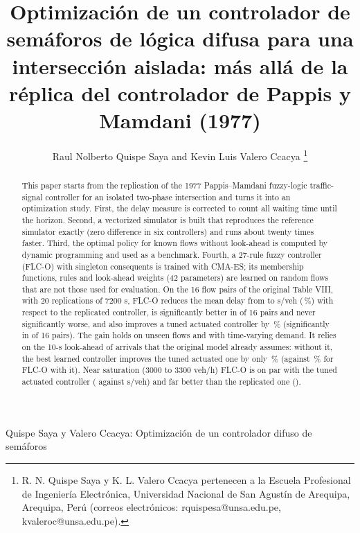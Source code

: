 \documentclass[journal]{IEEEtran}
\begin{document}
\title{Optimización de un controlador de semáforos de lógica difusa para una intersección aislada: más allá de la réplica del controlador de Pappis y Mamdani (1977)}

\author{Raul Nolberto Quispe Saya and Kevin Luis Valero Ccacya%
\thanks{R. N. Quispe Saya y K. L. Valero Ccacya pertenecen a la Escuela Profesional de Ingeniería Electrónica, Universidad Nacional de San Agustín de Arequipa, Arequipa, Perú (correos electrónicos: rquispesa@unsa.edu.pe, kvaleroc@unsa.edu.pe).}}

%
{Quispe Saya y Valero Ccacya: Optimización de un controlador difuso de semáforos}

\maketitle

\begin{abstract}
This paper starts from the replication of the 1977 Pappis--Mamdani fuzzy-logic traffic-signal controller for an isolated two-phase intersection and turns it into an optimization study. First, the delay measure is corrected to count all waiting time until the horizon. Second, a vectorized simulator is built that reproduces the reference simulator exactly (zero difference in six controllers) and runs about twenty times faster. Third, the optimal policy for known flows without look-ahead is computed by dynamic programming and used as a benchmark. Fourth, a 27-rule fuzzy controller (FLC-O) with singleton consequents is trained with CMA-ES; its membership functions, rules and look-ahead weights (42 parameters) are learned on random flows that are not those used for evaluation. On the 16 flow pairs of the original Table VIII, with 20 replications of 7200 s, FLC-O reduces the mean delay from \DelayOfPap{} to \DelayOfFlc{} s/veh (\RedFlc\,\%) with respect to the replicated controller, is significantly better in \ParMejorPap{} of 16 pairs and never significantly worse, and also improves a tuned actuated controller by \RedActAfOf\,\% (significantly in \ParMejorActAf{} of 16 pairs). The gain holds on unseen flows and with time-varying demand. It relies on the 10-s look-ahead of arrivals that the original model already assumes: without it, the best learned controller improves the tuned actuated one by only \RedActMlpC\,\% (against \RedActAfOf\,\% for FLC-O with it). Near saturation (3000 to 3300 veh/h) FLC-O is on par with the tuned actuated controller (\DelaySaFlc{} against \DelaySaActAf{} s/veh) and far better than the replicated one (\DelaySaPap{}).
\end{abstract}
\end{document}
